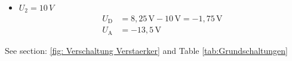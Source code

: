 {\begin{itemize}
        \item $U_2 = 10\,V$  
		\begin{align*}
            U_\mathrm{D} &= \mathrm{ 8,25\,V - 10\,V = -1,75\,V}\\
            U_\mathrm{A} &= \mathrm{-13,5\,V} 
		\end{align*}
    \end{itemize}
    See section: \ref{fig: Verschaltung Verstaerker} and Table \ref{tab:Grundschaltungen}
        
}